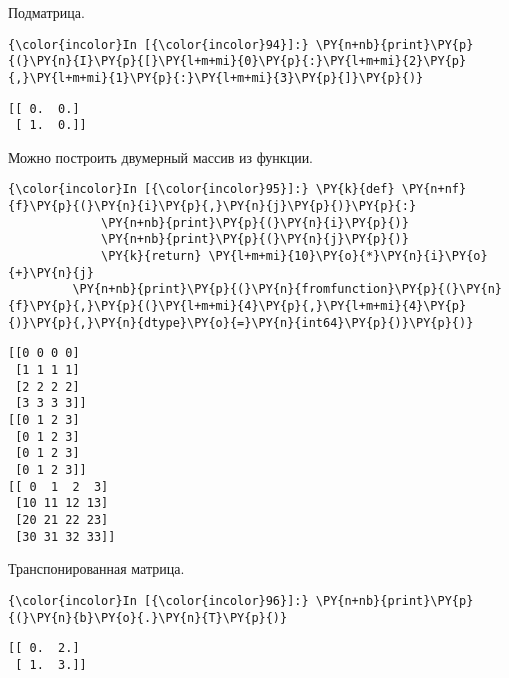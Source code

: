     Подматрица.

    \begin{Verbatim}[commandchars=\\\{\}]
{\color{incolor}In [{\color{incolor}94}]:} \PY{n+nb}{print}\PY{p}{(}\PY{n}{I}\PY{p}{[}\PY{l+m+mi}{0}\PY{p}{:}\PY{l+m+mi}{2}\PY{p}{,}\PY{l+m+mi}{1}\PY{p}{:}\PY{l+m+mi}{3}\PY{p}{]}\PY{p}{)}
\end{Verbatim}

    \begin{Verbatim}[commandchars=\\\{\}]
[[ 0.  0.]
 [ 1.  0.]]

    \end{Verbatim}

    Можно построить двумерный массив из функции.

    \begin{Verbatim}[commandchars=\\\{\}]
{\color{incolor}In [{\color{incolor}95}]:} \PY{k}{def} \PY{n+nf}{f}\PY{p}{(}\PY{n}{i}\PY{p}{,}\PY{n}{j}\PY{p}{)}\PY{p}{:}
             \PY{n+nb}{print}\PY{p}{(}\PY{n}{i}\PY{p}{)}
             \PY{n+nb}{print}\PY{p}{(}\PY{n}{j}\PY{p}{)}
             \PY{k}{return} \PY{l+m+mi}{10}\PY{o}{*}\PY{n}{i}\PY{o}{+}\PY{n}{j}
         \PY{n+nb}{print}\PY{p}{(}\PY{n}{fromfunction}\PY{p}{(}\PY{n}{f}\PY{p}{,}\PY{p}{(}\PY{l+m+mi}{4}\PY{p}{,}\PY{l+m+mi}{4}\PY{p}{)}\PY{p}{,}\PY{n}{dtype}\PY{o}{=}\PY{n}{int64}\PY{p}{)}\PY{p}{)}
\end{Verbatim}

    \begin{Verbatim}[commandchars=\\\{\}]
[[0 0 0 0]
 [1 1 1 1]
 [2 2 2 2]
 [3 3 3 3]]
[[0 1 2 3]
 [0 1 2 3]
 [0 1 2 3]
 [0 1 2 3]]
[[ 0  1  2  3]
 [10 11 12 13]
 [20 21 22 23]
 [30 31 32 33]]

    \end{Verbatim}

    Транспонированная матрица.

    \begin{Verbatim}[commandchars=\\\{\}]
{\color{incolor}In [{\color{incolor}96}]:} \PY{n+nb}{print}\PY{p}{(}\PY{n}{b}\PY{o}{.}\PY{n}{T}\PY{p}{)}
\end{Verbatim}

    \begin{Verbatim}[commandchars=\\\{\}]
[[ 0.  2.]
 [ 1.  3.]]

    \end{Verbatim}

